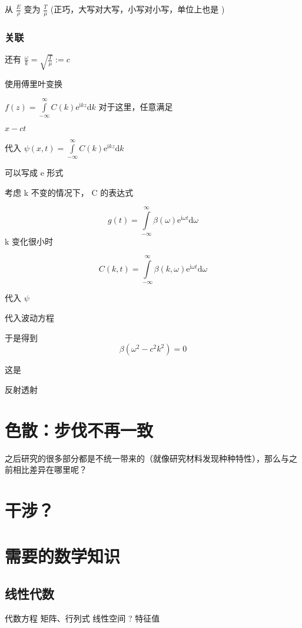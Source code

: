 \documentclass[11pt]{book}
\begin{document}
从 \(\frac{E}{\rho}\) 变为 \(\frac{T}{\mu}\) (正巧，大写对大写，小写对小写，单位上也是
)

\section{关联}
\label{sec:org913ca72}
还有
\(\frac{\omega}{k}=\sqrt{\frac{T}{\mu}}:=c\)

使用傅里叶变换

\(f(z)=\int\limits_{-\infty}^{\infty}C(k)\mathrm{e}^{\mathrm{i}kz}\mathrm{d}k\)
对于这里，任意满足

\(x-ct\)

代入 \(\psi(x,t)=\int\limits_{-\infty}^{\infty}C(k)\mathrm{e}^{\mathrm{i}kz}\mathrm{d}k\)

可以写成 e 形式

考虑 k 不变的情况下， C 的表达式

\begin{equation}
\label{eq:46}
g(t)=\int\limits_{-\infty}^{\infty}\beta(\omega)\mathrm{e}^{\mathrm{i}\omega t}\mathrm{d}\omega
\end{equation}
k 变化很小时

\begin{equation}
\label{eq:53}
C(k,t)=\int\limits_{-\infty}^{\infty}\beta(k,\omega)\mathrm{e}^{\mathrm{i}\omega t}\mathrm{d}\omega
\end{equation}


代入 \(\psi\)

代入波动方程

于是得到
\begin{equation}
\label{eq:54}
\beta(\omega^2-c^2k^2)=0
\end{equation}

这是

反射透射
\part{色散：步伐不再一致}
\label{sec:org86edffb}
之后研究的很多部分都是不统一带来的（就像研究材料发现种种特性），那么与之前相比差异在哪里呢？
\part{干涉？}
\label{sec:orgb56b035}
\part{需要的数学知识}
\label{sec:org0cd0ba7}
\chapter{线性代数}
\label{sec:org715ff21}
代数方程
矩阵、行列式
线性空间
? 特征值
\end{document}
